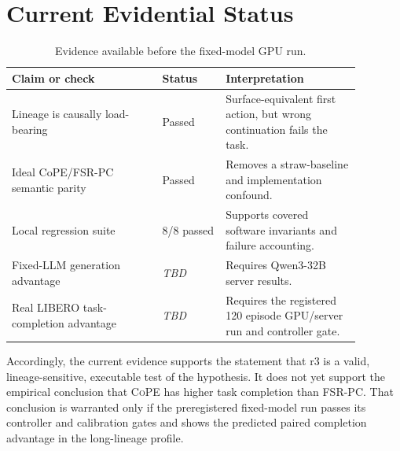 \documentclass[10pt]{article}
\newcommand{\CoPE}{\textsc{CoPE}}
\newcommand{\FSRPC}{\textsc{FSR-PC}}
\newcommand{\TBD}{\textit{TBD}}
\begin{document}
\section{Current Evidential Status}

\begin{table}[h]
\centering
\caption{Evidence available before the fixed-model GPU run.}
\begin{tabular}{p{0.38\linewidth}p{0.16\linewidth}p{0.34\linewidth}}
\toprule
Claim or check & Status & Interpretation \\
\midrule
Lineage is causally load-bearing & Passed & Surface-equivalent first action,
but wrong continuation fails the task. \\
Ideal CoPE/FSR-PC semantic parity & Passed & Removes a straw-baseline and
implementation confound. \\
Local regression suite & 8/8 passed & Supports covered software invariants and
failure accounting. \\
Fixed-LLM generation advantage & \TBD & Requires Qwen3-32B server results. \\
Real LIBERO task-completion advantage & \TBD & Requires the registered 120
episode GPU/server run and controller gate. \\
\bottomrule
\end{tabular}
\end{table}

Accordingly, the current evidence supports the statement that r3 is a valid,
lineage-sensitive, executable test of the hypothesis.  It does not yet support
the empirical conclusion that \CoPE{} has higher task completion than
\FSRPC{}.  That conclusion is warranted only if the preregistered fixed-model
run passes its controller and calibration gates and shows the predicted paired
completion advantage in the long-lineage profile.
\end{document}
